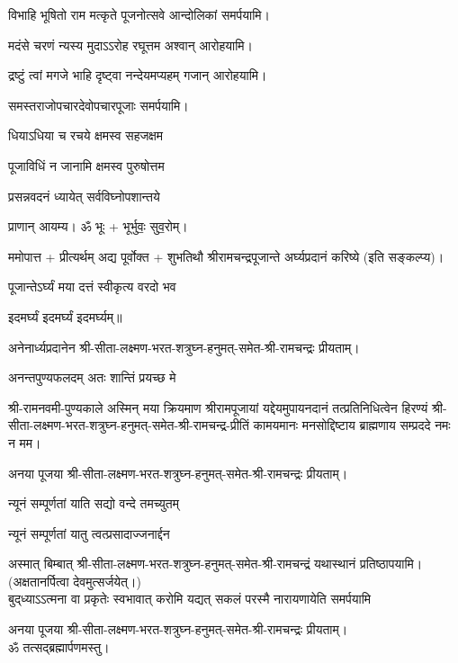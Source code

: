 \begin{center}
{विभाहि भूषितो राम मत्कृते पूजनोत्सवे}
\hfill आन्दोलिकां समर्पयामि।


{मदंसे चरणं न्यस्य मुदाऽऽरोह रघूत्तम}
\hfill अश्वान् आरोहयामि।


{द्रष्टुं त्वां मगजे भाहि दृष्ट्वा नन्देयमप्यहम्}
\hfill गजान् आरोहयामि।

समस्तराजोपचारदेवोपचारपूजाः समर्पयामि।



{धियाऽधिया च रचये क्षमस्व सहजक्षम}

{पूजाविधिं न जानामि क्षमस्व पुरुषोत्तम}



{प्रसन्नवदनं ध्यायेत् सर्वविघ्नोपशान्तये}


प्राणान्  आयम्य।  ॐ भूः + भूर्भुवः॒ सुव॒रोम्।

ममोपात्त + प्रीत्यर्थम् अद्य पूर्वोक्त + शुभतिथौ श्रीरामचन्द्रपूजान्ते अर्घ्यप्रदानं करिष्ये (इति सङ्कल्प्य)।

{पूजान्तेऽर्घ्यं मया दत्तं स्वीकृत्य वरदो भव}

\devAya{} इदमर्घ्यं इदमर्घ्यं इदमर्घ्यम्॥

अनेनार्ध्यप्रदानेन श्री-सीता-लक्ष्मण-भरत-शत्रुघ्न-हनुमत्-समेत-श्री-रामचन्द्रः प्रीयताम्।

{अनन्तपुण्यफलदम् अतः शान्तिं प्रयच्छ मे}

श्री-रामनवमी-पुण्यकाले अस्मिन् मया क्रियमाण श्रीरामपूजायां यद्देयमुपायनदानं तत्प्रतिनिधित्वेन हिरण्यं श्री-सीता-लक्ष्मण-भरत-शत्रुघ्न-हनुमत्-समेत-श्री-रामचन्द्र-प्रीतिं 
कामयमानः मनसोद्दिष्टाय ब्राह्मणाय सम्प्रददे नमः न मम। 

अनया पूजया श्री-सीता-लक्ष्मण-भरत-शत्रुघ्न-हनुमत्-समेत-श्री-रामचन्द्रः प्रीयताम्। 
 
{न्यूनं सम्पूर्णतां याति सद्यो वन्दे तमच्युतम्} 

{न्यूनं सम्पूर्णतां यातु त्वत्प्रसादाज्जनार्द्दन}

अस्मात् बिम्बात् श्री-सीता-लक्ष्मण-भरत-शत्रुघ्न-हनुमत्-समेत-श्री-रामचन्द्रं यथास्थानं प्रतिष्ठापयामि।\\
(अक्षतानर्पित्वा देवमुत्सर्जयेत्।)\\

{बुद्‌ध्याऽऽत्मना वा प्रकृतेः स्वभावात्}
{करोमि यद्यत् सकलं परस्मै}
{नारायणायेति समर्पयामि}

अनया पूजया श्री-सीता-लक्ष्मण-भरत-शत्रुघ्न-हनुमत्-समेत-श्री-रामचन्द्रः प्रीयताम्। \\
ॐ तत्सद्ब्रह्मार्पणमस्तु।

\end{center}

\closesub



\closesection